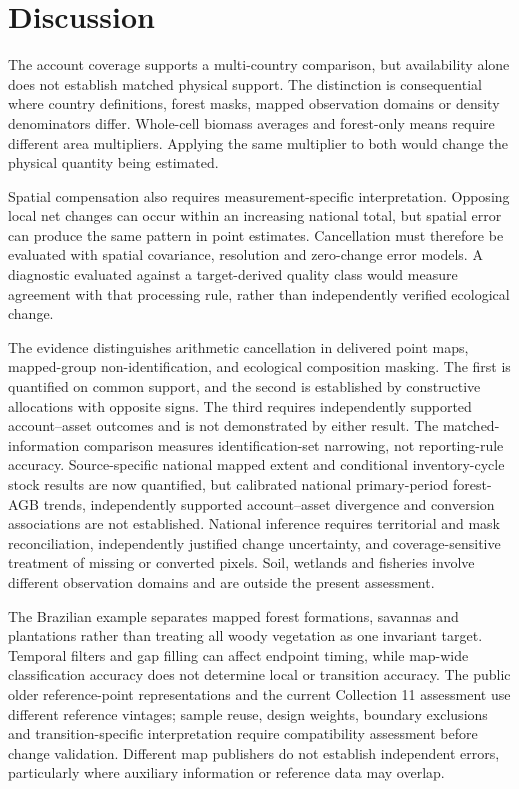 \documentclass[11pt,a4paper]{article}
\begin{document}
\section{Discussion}
The account coverage supports a multi-country comparison, but availability alone does not establish matched physical support. The distinction is consequential where country definitions, forest masks, mapped observation domains or density denominators differ. Whole-cell biomass averages and forest-only means require different area multipliers. Applying the same multiplier to both would change the physical quantity being estimated.

Spatial compensation also requires measurement-specific interpretation. Opposing local net changes can occur within an increasing national total, but spatial error can produce the same pattern in point estimates. Cancellation must therefore be evaluated with spatial covariance, resolution and zero-change error models. A diagnostic evaluated against a target-derived quality class would measure agreement with that processing rule, rather than independently verified ecological change.

The evidence distinguishes arithmetic cancellation in delivered point maps, mapped-group non-identification, and ecological composition masking. The first is quantified on common support, and the second is established by constructive allocations with opposite signs. The third requires independently supported account--asset outcomes and is not demonstrated by either result. The matched-information comparison measures identification-set narrowing, not reporting-rule accuracy. Source-specific national mapped extent and conditional inventory-cycle stock results are now quantified, but calibrated national primary-period forest-AGB trends, independently supported account--asset divergence and conversion associations are not established. National inference requires territorial and mask reconciliation, independently justified change uncertainty, and coverage-sensitive treatment of missing or converted pixels. Soil, wetlands and fisheries involve different observation domains and are outside the present assessment.

The Brazilian example separates mapped forest formations, savannas and plantations rather than treating all woody vegetation as one invariant target. Temporal filters and gap filling can affect endpoint timing, while map-wide classification accuracy does not determine local or transition accuracy. The public older reference-point representations and the current Collection 11 assessment use different reference vintages; sample reuse, design weights, boundary exclusions and transition-specific interpretation require compatibility assessment before change validation. Different map publishers do not establish independent errors, particularly where auxiliary information or reference data may overlap.
\end{document}
